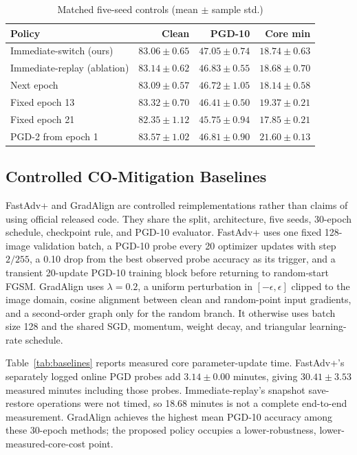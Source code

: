 \begin{table}[t]
\centering
\caption{Matched five-seed controls (mean $\pm$ sample std.)}
\label{tab:components}
\scriptsize
\setlength{\tabcolsep}{2.5pt}
\begin{tabular}{lrrr}
\toprule
Policy & Clean & PGD-10 & Core min \\
\midrule
Immediate-switch (ours) & $83.06\pm0.65$ & $47.05\pm0.74$ & $18.74\pm0.63$ \\
Immediate-replay (ablation) & $83.14\pm0.62$ & $46.83\pm0.55$ & $18.68\pm0.70$ \\
Next epoch & $83.09\pm0.57$ & $46.72\pm1.05$ & $18.14\pm0.58$ \\
Fixed epoch 13 & $83.32\pm0.70$ & $46.41\pm0.50$ & $19.37\pm0.21$ \\
Fixed epoch 21 & $82.35\pm1.12$ & $45.75\pm0.94$ & $17.85\pm0.21$ \\
PGD-2 from epoch 1 & $83.57\pm1.02$ & $46.81\pm0.90$ & $21.60\pm0.13$ \\
\bottomrule
\end{tabular}
\end{table}

\subsection{Controlled CO-Mitigation Baselines}
FastAdv+ and GradAlign are controlled reimplementations rather than claims of
using official released code. They share the split, architecture, five seeds,
30-epoch schedule, checkpoint rule, and PGD-10 evaluator. FastAdv+ uses one
fixed 128-image validation batch, a PGD-10 probe every 20 optimizer updates
with step $2/255$, a 0.10 drop from the best observed probe accuracy as its
trigger, and a transient 20-update PGD-10 training block before returning to
random-start FGSM. GradAlign uses $\lambda=0.2$, a uniform perturbation in
$[-\epsilon,\epsilon]$ clipped to the image domain, cosine alignment between
clean and random-point input gradients, and a second-order graph only for the
random branch. It otherwise uses batch size 128 and the shared SGD, momentum,
weight decay, and triangular learning-rate schedule.

Table~\ref{tab:baselines} reports measured core parameter-update time.
FastAdv+'s separately logged online PGD probes add
$3.14\pm0.00$ minutes, giving $30.41\pm3.53$ measured minutes including
those probes. Immediate-replay's snapshot save-restore operations were not
timed, so 18.68 minutes is not a complete end-to-end measurement. GradAlign
achieves the highest mean PGD-10 accuracy among these 30-epoch methods; the
proposed policy occupies a lower-robustness, lower-measured-core-cost point.

